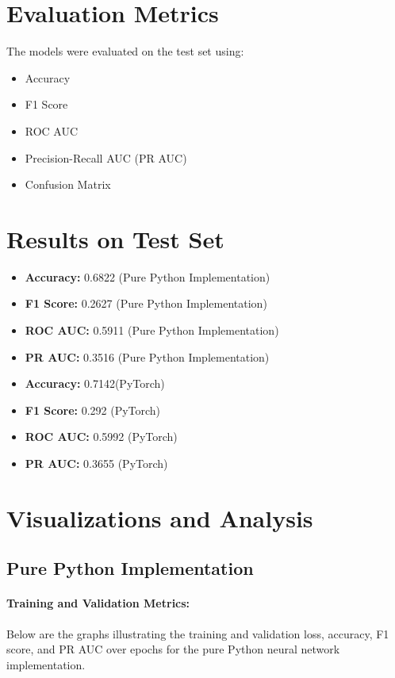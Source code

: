 \documentclass[12pt]{article}
\begin{document}
\section*{Evaluation Metrics}
The models were evaluated on the test set using:

\begin{itemize}
    \item Accuracy
    \item F1 Score
    \item ROC AUC
    \item Precision-Recall AUC (PR AUC)
    \item Confusion Matrix
\end{itemize}

\section*{Results on Test Set}

\begin{itemize}
    \item \textbf{Accuracy:} 0.6822 (Pure Python Implementation)
    \item \textbf{F1 Score:} 0.2627 (Pure Python Implementation)
    \item \textbf{ROC AUC:} 0.5911 (Pure Python Implementation)
    \item \textbf{PR AUC:} 0.3516 (Pure Python Implementation)
\end{itemize}
\begin{itemize}
    \item \textbf{Accuracy:} 0.7142(PyTorch)
    \item \textbf{F1 Score:} 0.292 (PyTorch)
    \item \textbf{ROC AUC:} 0.5992 (PyTorch)
    \item \textbf{PR AUC:} 0.3655 (PyTorch)
\end{itemize}
\section{Visualizations and Analysis}

\subsection{Pure Python Implementation}

\paragraph{Training and Validation Metrics:}  
Below are the graphs illustrating the training and validation loss, accuracy, F1 score, and PR AUC over epochs for the pure Python neural network implementation.
\end{document}
